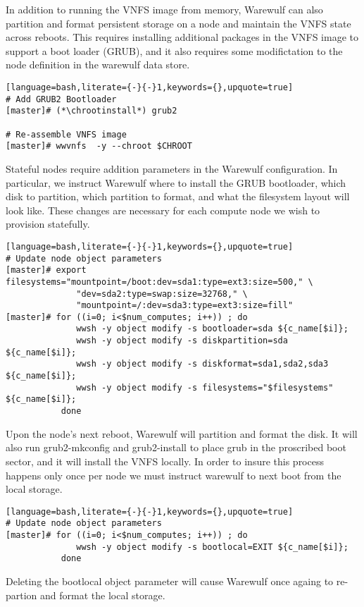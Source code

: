 In addition to running the VNFS image from memory, Warewulf can also partition
and format persistent storage on a node and maintain the VNFS state across
reboots. This requires installing additional packages in the VNFS image to
support a boot loader (GRUB), and it also requires some modifictation to the
node definition in the warewulf data store. 

\begin{lstlisting}[language=bash,literate={-}{-}1,keywords={},upquote=true]
# Add GRUB2 Bootloader
[master]# (*\chrootinstall*) grub2

# Re-assemble VNFS image
[master]# wwvnfs  -y --chroot $CHROOT
\end{lstlisting}

Stateful nodes require addition parameters in the Warewulf configuration. In
particular, we instruct Warewulf where to install the GRUB bootloader, which
disk to partition, which partition to format, and what the filesystem layout
will look like. These changes are necessary for each compute node we wish to
provision statefully.

\begin{lstlisting}[language=bash,literate={-}{-}1,keywords={},upquote=true]
# Update node object parameters
[master]# export filesystems="mountpoint=/boot:dev=sda1:type=ext3:size=500," \
              "dev=sda2:type=swap:size=32768," \
              "mountpoint=/:dev=sda3:type=ext3:size=fill"
[master]# for ((i=0; i<$num_computes; i++)) ; do 
              wwsh -y object modify -s bootloader=sda ${c_name[$i]};
              wwsh -y object modify -s diskpartition=sda ${c_name[$i]};
              wwsh -y object modify -s diskformat=sda1,sda2,sda3 ${c_name[$i]};
              wwsh -y object modify -s filesystems="$filesystems" ${c_name[$i]};
           done
\end{lstlisting}

Upon the node's next reboot, Warewulf will partition and format the disk. It
will also run grub2-mkconfig and grub2-install to place grub in the proscribed
boot sector, and it will install the VNFS locally. In order to insure this 
process happens only once per node we must instruct warewulf to next boot from 
the local storage.

\begin{lstlisting}[language=bash,literate={-}{-}1,keywords={},upquote=true]
# Update node object parameters
[master]# for ((i=0; i<$num_computes; i++)) ; do 
              wwsh -y object modify -s bootlocal=EXIT ${c_name[$i]};
           done
\end{lstlisting}

Deleting the bootlocal object parameter will cause Warewulf once againg to
re-partion and format the local storage.
